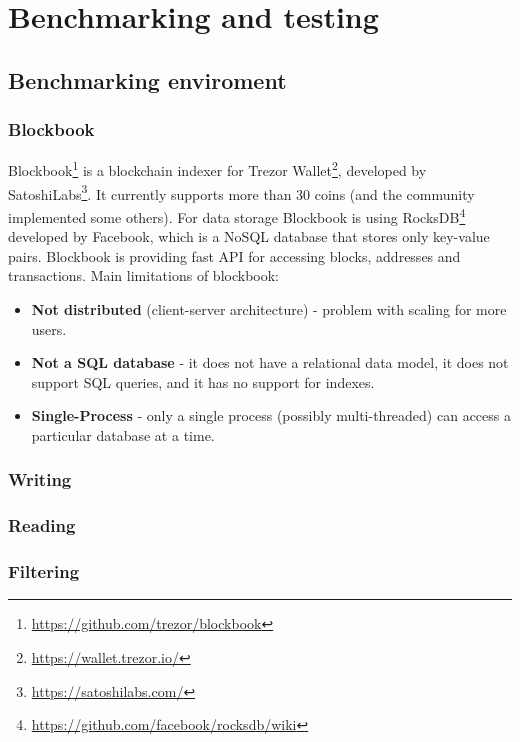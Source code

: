 \chapter{Benchmarking and testing}

\section{Benchmarking enviroment}

\subsection{Blockbook}
Blockbook\footnote{\url{https://github.com/trezor/blockbook}} is a blockchain indexer for Trezor Wallet\footnote{\url{https://wallet.trezor.io/}}, developed by SatoshiLabs\footnote{\url{https://satoshilabs.com/}}. It currently supports more than 30 coins (and the community implemented some others). For data storage Blockbook is using RocksDB\footnote{\url{https://github.com/facebook/rocksdb/wiki}} developed by Facebook, which is a NoSQL database that stores only key-value pairs. Blockbook is providing fast API for accessing blocks, addresses and transactions. Main limitations of blockbook:
\begin{itemize}
    \item \textbf{Not distributed} (client-server architecture) - problem with scaling for more users. 
    \item \textbf{Not a SQL database} - it does not have a relational data model, it does not support SQL queries, and it has no support for indexes.
    \item \textbf{Single-Process} - only a single process (possibly multi-threaded) can access a particular database at a time.
\end{itemize}

\subsection{Writing}

\subsection{Reading}


\subsection{Filtering}